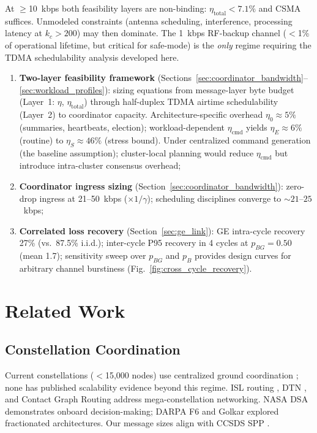 \documentclass[journal]{IEEEtran}
\begin{document}
\noindent At $\geq$10~kbps both feasibility layers are non-binding: $\eta_{\text{total}} < 7.1\%$ and CSMA suffices. Unmodeled constraints (antenna scheduling, interference, processing latency at $k_c > 200$) may then dominate. The 1~kbps RF-backup channel ($<$1\% of operational lifetime, but critical for safe-mode) is the \emph{only} regime requiring the TDMA schedulability analysis developed here.
\begin{enumerate}
    \item \textbf{Two-layer feasibility framework} (Sections~\ref{sec:coordinator_bandwidth}--\ref{sec:workload_profiles}): sizing equations from message-layer byte budget (Layer~1: $\eta$, $\eta_{\text{total}}$) through half-duplex TDMA airtime schedulability (Layer~2) to coordinator capacity. Architecture-specific overhead $\eta_0 \approx 5\%$ (summaries, heartbeats, election); workload-dependent $\eta_{\text{cmd}}$ yields $\eta_E \approx 6\%$ (routine) to $\eta_S \approx 46\%$ (stress bound). Under centralized command generation (the baseline assumption); cluster-local planning would reduce $\eta_{\text{cmd}}$ but introduce intra-cluster consensus overhead;
    \item \textbf{Coordinator ingress sizing} (Section~\ref{sec:coordinator_bandwidth}): zero-drop ingress at 21--50~kbps ($\times 1/\gamma$); scheduling disciplines converge to ${\sim}21$--$25$~kbps;
    \item \textbf{Correlated loss recovery} (Section~\ref{sec:ge_link}): GE intra-cycle recovery 27\% (vs.\ 87.5\% i.i.d.); inter-cycle P95 recovery in 4 cycles at $p_{BG} = 0.50$ (mean 1.7); sensitivity sweep over $p_{BG}$ and $p_B$ provides design curves for arbitrary channel burstiness (Fig.~\ref{fig:cross_cycle_recovery}).
\end{enumerate}


\section{Related Work}

\subsection{Constellation Coordination}

Current constellations ($<$15{,}000 nodes) use centralized ground coordination \cite{starlink_ops, esa_conjunction, oneweb_mgmt}; none has published scalability evidence beyond this regime. ISL routing \cite{iridium_arch, handley_2018, del_portillo_mega, bhattacherjee_isl}, DTN \cite{cerf_dtn, ccsds_bpv7}, and Contact Graph Routing \cite{fraire_cgr} address mega-constellation networking. NASA DSA \cite{nasa_dsa} demonstrates onboard decision-making; DARPA F6 \cite{darpa_f6} and Golkar \cite{golkar_federated} explored fractionated architectures. Our message sizes align with CCSDS SPP \cite{ccsds_spp}.
\end{document}
